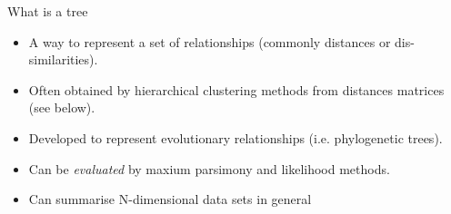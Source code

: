 \documentclass[pdf]{beamer}
\begin{document}
\begin{frame}{What is a tree}
  \begin{itemize}
  \item A way to represent a set of relationships (commonly distances or dis-similarities).
  \item Often obtained by hierarchical clustering methods from distances matrices (see below).
  \item Developed to represent evolutionary relationships (i.e. phylogenetic trees).
  \item Can be \emph{evaluated} by maxium parsimony and likelihood methods.
  \item Can summarise N-dimensional data sets in general
  \end{itemize}
\end{frame}
\end{document}
